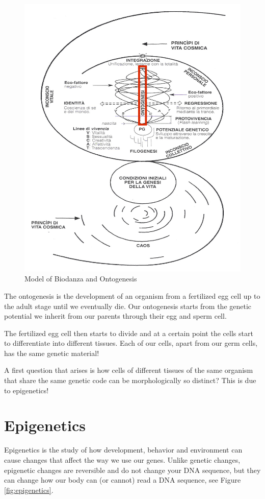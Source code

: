 \documentclass[
  11pt,
]{book}
\begin{document}
\begin{figure}

{\centering \includegraphics[width=0.5\linewidth]{./figs/biologischeAspectenBiodanzaDeelIII} 

}

\caption{Model of Biodanza and Ontogenesis}\label{fig:modelOnto}
\end{figure}

The ontogenesis is the development of an organism from a fertilized egg cell up to the adult stage until we eventually die. Our ontogenesis starts from the genetic potential we inherit from our parents through their egg and sperm cell.

The fertilized egg cell then starts to divide and at a certain point the cells start to differentiate into different tissues.
Each of our cells, apart from our germ cells, has the same genetic material!

A first question that arises is how cells of different tissues of the same organism that share the same genetic code can be morphologically so distinct? This is due to epigenetics!

\hypertarget{epigenetics}{%
\section{Epigenetics}\label{epigenetics}}

Epigenetics is the study of how development, behavior and environment can cause changes that affect the way we use our genes. Unlike genetic changes, epigenetic changes are reversible and do not change your DNA sequence, but they can change how our body can (or cannot) read a DNA sequence, see Figure \ref{fig:epigenetics}.
\end{document}
